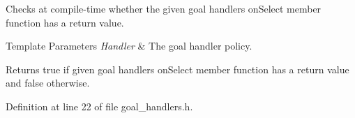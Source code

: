 Checks at compile-\/time whether the given goal handler\textquotesingle{}s {\ttfamily on\+Select} member function has a return value. 


\begin{DoxyTemplParams}{Template Parameters}
{\em Handler} & The goal handler policy. \\
\hline
\end{DoxyTemplParams}
\begin{DoxyReturn}{Returns}
{\ttfamily true} if given goal handler\textquotesingle{}s {\ttfamily on\+Select} member function has a return value and {\ttfamily false} otherwise. 
\end{DoxyReturn}


Definition at line 22 of file goal\+\_\+handlers.\+h.

